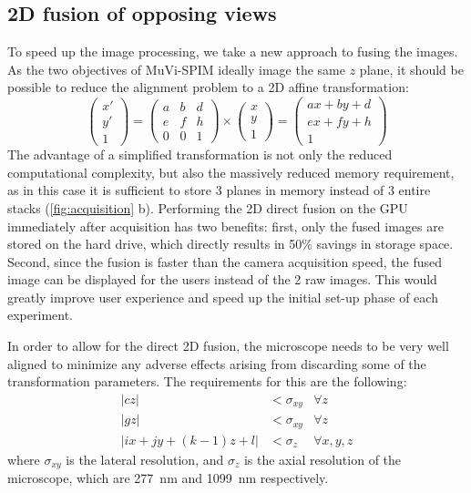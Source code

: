 \subsection{2D fusion of opposing views}
To speed up the image processing, we take a new approach to fusing the images. As the two objectives of MuVi-SPIM ideally image the same $z$ plane, it should be possible to reduce the alignment problem to a 2D affine transformation:
\[ 
\begin{pmatrix}
x'\\
y'\\
1
\end{pmatrix}
=
\begin{pmatrix}
a & b & d\\ 
e & f & h \\
0 & 0 & 1
\end{pmatrix}
\times
\begin{pmatrix}
x\\
y\\
1
\end{pmatrix}
=
\begin{pmatrix}
a x + b y + d\\ 
e x + f y + h\\
1
\end{pmatrix}
\]
The advantage of a simplified transformation is not only the reduced computational complexity, but also the massively reduced memory requirement, as in this case it is sufficient to store 3 planes in memory instead of 3 entire stacks (\autoref{fig:acquisition} b). Performing the 2D direct fusion on the GPU immediately after acquisition has two benefits: first, only the fused images are stored on the hard drive, which directly results in 50\% savings in storage space. Second, since the fusion is faster than the camera acquisition speed, the fused image can be displayed for the users instead of the 2 raw images. This would greatly improve user experience and speed up the initial set-up phase of each experiment.

In order to allow for the direct 2D fusion, the microscope needs to be very well aligned to minimize any adverse effects arising from discarding some of the transformation parameters. The requirements for this are the following:
\begin{align}
\left| c z \right| &< \sigma_{xy} & \forall z \label{eq:req1}\\
\left| g z \right|  &< \sigma_{xy} & \forall z \label{eq:req2}\\
\left| i x + j y + (k-1)  z + l \right| &< \sigma_z & \forall x, y, z  \label{eq:req3}
\end{align}
where $\sigma_{xy}$ is the lateral resolution, and $\sigma_z$ is the axial resolution of the microscope, which are \SI{277}{nm} and \SI{1099}{nm} respectively. 

